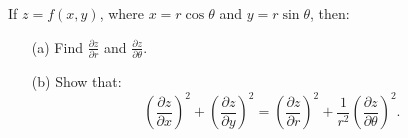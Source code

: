 \documentclass[12pt]{amsart}
\begin{document}
\begin{question}
	If $z = f(x, y)$, where $x = r \cos\theta$ and $y = r \sin\theta$, then:

	\begin{enumerate}
		\item[(a)] Find $\frac{\partial z}{\partial r}$ and $\frac{\partial z}{\partial \theta}$.
		\item[(b)] Show that:
		      \[
			      \left( \frac{\partial z}{\partial x} \right)^2 + \left( \frac{\partial z}{\partial y} \right)^2 = \left( \frac{\partial z}{\partial r} \right)^2 + \frac{1}{r^2} \left( \frac{\partial z}{\partial \theta} \right)^2.
		      \]
	\end{enumerate}
\end{question}
\vspace{7cm}
\end{document}
